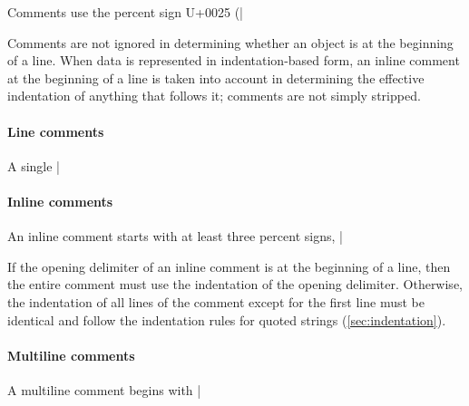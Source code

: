 \documentclass[11pt]{article}
\begin{document}
Comments use the percent sign U+0025 (|%

Comments are not ignored in determining whether an object is at the beginning of a line.  When data is represented in indentation-based form, an inline comment at the beginning of a line is taken into account in determining the effective indentation of anything that follows it; comments are not simply stripped.

\paragraph{Line comments}

A single |%


\paragraph{Inline comments}

An inline comment starts with at least three percent signs, |%

If the opening delimiter of an inline comment is at the beginning of a line, then the entire comment must use the indentation of the opening delimiter.  Otherwise, the indentation of all lines of the comment except for the first line must be identical and follow the indentation rules for quoted strings (\cref{sec:indentation}).


\paragraph{Multiline comments}

A multiline comment begins with |%
\end{document}
